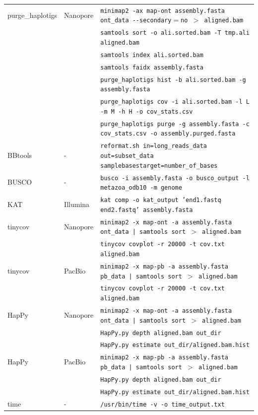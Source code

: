 \begin{table}[ht]
{\begin{tabular}{lll}
purge\_haplotigs & Nanopore & \texttt{minimap2 -ax map-ont assembly.fasta ont\_data -{}-secondary$=$no $>$ aligned.bam}\\
    & & \texttt{samtools sort -o ali.sorted.bam -T tmp.ali aligned.bam} \\
    & & \texttt{samtools index ali.sorted.bam} \\
    & & \texttt{samtools faidx assembly.fasta} \\
    & & \texttt{purge\_haplotigs hist -b ali.sorted.bam -g assembly.fasta} \\
    & & \texttt{purge\_haplotigs cov -i ali.sorted.bam -l L -m M -h H -o cov\_stats.csv}\\
    & & \texttt{purge\_haplotigs purge -g assembly.fasta -c cov\_stats.csv -o assembly.purged.fasta}\\
BBtools & - & \texttt{reformat.sh in=long\_reads\_data out=subset\_data samplebasestarget=number\_of\_bases} \\
BUSCO & - & \texttt{busco -i assembly.fasta -o busco\_output -l metazoa\_odb10 -m genome} \\
KAT & Illumina & \texttt{kat comp -o kat\_output 'end1.fastq end2.fastq' assembly.fasta} \\
tinycov & Nanopore & \texttt{minimap2 -x map-ont -a assembly.fasta ont\_data | samtools sort $>$ aligned.bam} \\
    & & \texttt{tinycov covplot -r 20000 -t cov.txt aligned.bam} \\
tinycov & PacBio & \texttt{minimap2 -x map-pb -a assembly.fasta pb\_data | samtools sort $>$ aligned.bam} \\
    & & \texttt{tinycov covplot -r 20000 -t cov.txt aligned.bam} \\
HapPy & Nanopore & \texttt{minimap2 -x map-ont -a assembly.fasta ont\_data | samtools sort $>$ aligned.bam} \\
    & & \texttt{HapPy.py depth aligned.bam out\_dir} \\
    & & \texttt{HapPy.py estimate out\_dir/aligned.bam.hist} \\
HapPy & PacBio & \texttt{minimap2 -x map-pb -a assembly.fasta pb\_data | samtools sort $>$ aligned.bam} \\
    & & \texttt{HapPy.py depth aligned.bam out\_dir} \\
    & & \texttt{HapPy.py estimate out\_dir/aligned.bam.hist} \\
time & - & \texttt{/usr/bin/time -v -o time\_output.txt}\\
\hline
\end{tabular}
}
\label{tab:command_lines}
\end{table}

